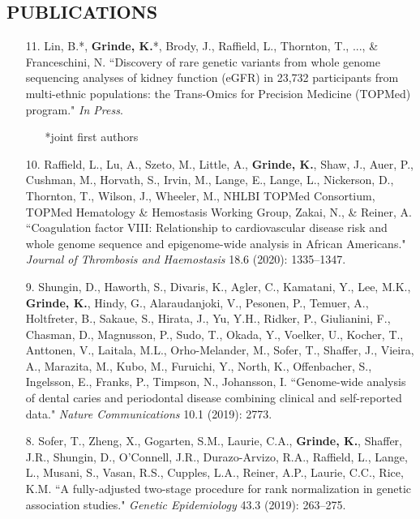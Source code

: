 \documentclass[margin]{res}
\begin{document}
\begin{resume}
										
\section{PUBLICATIONS} 

\begin{itemize}

\item[11.] Lin, B.*, \textbf{Grinde, K.}*, Brody, J., Raffield, L., Thornton, T., ..., \& Franceschini, N. ``Discovery of rare genetic variants from whole genome sequencing analyses  of kidney function (eGFR) in 23,732 participants from multi-ethnic populations: the Trans-Omics for Precision Medicine (TOPMed) program." \textit{In Press}.
	\begin{itemize}
	\item[] *joint first authors
	\end{itemize}

\item[10.] Raffield, L., Lu, A., Szeto, M., Little, A., \textbf{Grinde, K.},  Shaw, J., Auer, P., Cushman, M., Horvath, S., Irvin, M., Lange, E., Lange, L., Nickerson, D., Thornton, T., Wilson, J., Wheeler, M., NHLBI TOPMed Consortium, TOPMed Hematology \& Hemostasis Working Group, Zakai, N., \& Reiner, A. ``Coagulation factor VIII: Relationship to cardiovascular disease risk and whole genome sequence and epigenome-wide analysis in African Americans." \textit{Journal of Thrombosis and Haemostasis} 18.6 (2020): 1335--1347.

\item[9.] Shungin, D., Haworth, S., Divaris, K., Agler, C., Kamatani, Y., Lee, M.K., \textbf{Grinde, K.}, Hindy, G., Alaraudanjoki, V., Pesonen, P., Temuer, A., Holtfreter, B., Sakaue, S., Hirata, J., Yu, Y.H., Ridker, P., Giulianini, F., Chasman, D., Magnusson, P., Sudo, T., Okada, Y., Voelker, U., Kocher, T., Anttonen, V., Laitala, M.L., Orho-Melander, M., Sofer, T., Shaffer, J., Vieira, A., Marazita, M., Kubo, M., Furuichi, Y., North, K., Offenbacher, S., Ingelsson, E., Franks, P., Timpson, N., Johansson, I. ``Genome-wide analysis of dental caries and periodontal disease combining clinical and self-reported data." \textit{Nature Communications} 10.1 (2019): 2773.

\item[8.] Sofer, T., Zheng, X., Gogarten, S.M., Laurie, C.A., \textbf{Grinde, K.}, Shaffer, J.R., Shungin, D., O'Connell, J.R., Durazo-Arvizo, R.A., Raffield, L., Lange, L., Musani, S., Vasan, R.S., Cupples, L.A., Reiner, A.P., Laurie, C.C., Rice, K.M. ``A fully-adjusted two-stage procedure for rank normalization in genetic association studies." \textit{Genetic Epidemiology} 43.3 (2019): 263--275.


\end{itemize}
\end{resume}
\end{document}
